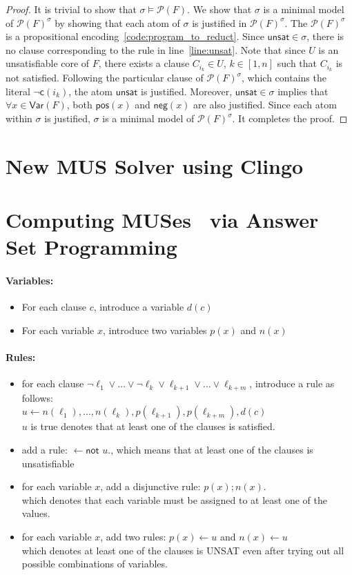 \documentclass{article}
\newtheorem{proof}{Proof}
\newcommand{\unsat}{\ensuremath{\mathsf{unsat}}}
\newcommand{\pos}[1]{\ensuremath{\mathsf{pos}(#1)}}
\newcommand{\ngt}[1]{\ensuremath{\mathsf{neg}(#1)}}
\newcommand{\cls}[1]{\ensuremath{\mathsf{c}(#1)}}
\newcommand{\program}[1]{\mathcal{P}(#1)}
\newcommand{\Var}[1]{\mathsf{Var}(#1)}
\begin{document}
\begin{proof}
  It is trivial to show that $\sigma \models \program{F}$. We show that  $\sigma$ is a minimal model of $\program{F}^{\sigma}$ by showing that each atom of $\sigma$ is justified in $\program{F}^{\sigma}$. 
  The $\program{F}^{\sigma}$ is a propositional encoding~\ref{code:program_to_reduct}.
  Since $\unsat \in \sigma$, there is no clause corresponding to the rule in line~\ref{line:unsat}. 
  Note that since $U$ is an unsatisfiable core of $F$, there exists a clause $C_{i_k} \in U$, $k \in [1,n]$ such that $C_{i_k}$ is not satisfied.
  Following the particular clause of $\program{F}^{\sigma}$, which contains the literal $\neg \cls{i_k}$, the atom $\unsat$ is justified. 
  Moreover, $\unsat \in \sigma$ implies that $\forall x \in \Var{F}$, both $\pos{x}$ and $\ngt{x}$ are also justified.
  Since each atom within $\sigma$ is justified, $\sigma$ is a minimal model of $\program{F}^{\sigma}$. It completes the proof. 
\end{proof}
\section{New MUS Solver using Clingo}
\section{Computing MUSes~\cite{LPMM2016} via Answer Set Programming}
\paragraph{Variables:}
\begin{itemize}
    \item For each clause $c$, introduce a variable $d(c)$
    \item For each variable $x$, introduce two variables $p(x)$ and $n(x)$
\end{itemize}
\paragraph{Rules:}
\begin{itemize}
    \item for each clause $\neg{\ell_1} \vee \ldots \vee 
    \neg{\ell_k} \vee \ell_{k+1} \vee \ldots \vee \ell_{k+m}$, 
    introduce a rule as follows:\\
    $u \leftarrow n(\ell_1), \ldots, n(\ell_k), p(\ell_{k+1}), p(\ell_{k+m}), d(c)$\\
    $u$ is true denotes that at least one of the clauses is satisfied.
    \item add a rule: $\leftarrow \textsf{not } u.$,
    which means that at least one of the clauses is unsatisfiable
    \item for each variable $x$, add a disjunctive rule: $p(x) ; n(x).$\\
    which denotes that each variable must be assigned to at least one of the values.
    \item for each variable $x$, add two rules: $p(x) \leftarrow u$ and $n(x) \leftarrow u$\\
    which denotes at least one of the clauses is UNSAT even after trying out all possible combinations of variables.
\end{itemize}
\end{document}
